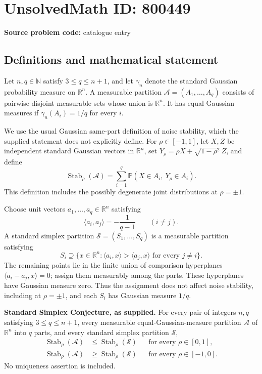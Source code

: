 \documentclass[11pt]{article}
\newcommand{\N}{\mathbb{N}}
\newcommand{\R}{\mathbb{R}}
\begin{document}
\section*{UnsolvedMath ID: 800449}
\textbf{Source problem code:} catalogue entry
\subsection{Definitions and mathematical statement}
Let \(n,q\in\N\) satisfy \(3\leq q\leq n+1\), and let \(\gamma_n\) denote the standard Gaussian probability measure on \(\R^n\). A measurable partition \(\mathcal A=(A_1,\ldots,A_q)\) consists of pairwise disjoint measurable sets whose union is \(\R^n\). It has equal Gaussian measures if \(\gamma_n(A_i)=1/q\) for every \(i\).

We use the usual Gaussian same-part definition of noise stability, which the supplied statement does not explicitly define. For \(\rho\in[-1,1]\), let \(X,Z\) be independent standard Gaussian vectors in \(\R^n\), set \(Y_\rho=\rho X+\sqrt{1-\rho^2}\,Z\), and define
\[
\operatorname{Stab}_\rho(\mathcal A)=\sum_{i=1}^q\mathbb P(X\in A_i,\ Y_\rho\in A_i).
\]
This definition includes the possibly degenerate joint distributions at \(\rho=\pm1\).

Choose unit vectors \(a_1,\ldots,a_q\in\R^n\) satisfying
\[
\langle a_i,a_j\rangle=-\frac{1}{q-1}\qquad(i\ne j).
\]
A standard simplex partition \(\mathcal S=(S_1,\ldots,S_q)\) is a measurable partition satisfying
\[
S_i\supseteq\{x\in\R^n:\langle a_i,x\rangle>\langle a_j,x\rangle\text{ for every }j\ne i\}.
\]
The remaining points lie in the finite union of comparison hyperplanes \(\langle a_i-a_j,x\rangle=0\); assign them measurably among the parts. These hyperplanes have Gaussian measure zero. Thus the assignment does not affect noise stability, including at \(\rho=\pm1\), and each \(S_i\) has Gaussian measure \(1/q\).

\textbf{Standard Simplex Conjecture, as supplied.} For every pair of integers \(n,q\) satisfying \(3\leq q\leq n+1\), every measurable equal-Gaussian-measure partition \(\mathcal A\) of \(\R^n\) into \(q\) parts, and every standard simplex partition \(\mathcal S\),
\[
\begin{aligned}
\operatorname{Stab}_\rho(\mathcal A)&\leq\operatorname{Stab}_\rho(\mathcal S)&&\text{for every }\rho\in[0,1],\\
\operatorname{Stab}_\rho(\mathcal A)&\geq\operatorname{Stab}_\rho(\mathcal S)&&\text{for every }\rho\in[-1,0].
\end{aligned}
\]
No uniqueness assertion is included.
\end{document}
